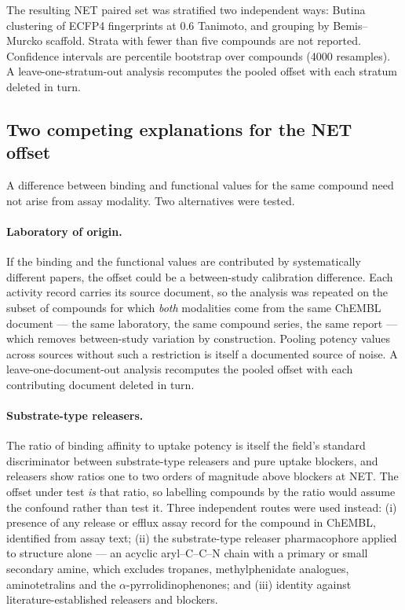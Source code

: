 \documentclass[11pt,a4paper]{article}
\begin{document}
The resulting NET paired set was stratified two independent ways: Butina
clustering \cite{Butina1999} of ECFP4 fingerprints at 0.6 Tanimoto, and grouping by
Bemis--Murcko scaffold. Strata with fewer than five compounds are not reported.
Confidence intervals are percentile bootstrap over compounds (4000 resamples).
A leave-one-stratum-out analysis recomputes the pooled offset with each stratum
deleted in turn.

\subsection{Two competing explanations for the NET offset}
\label{sec:confounds}
A difference between binding and functional values for the same compound need not
arise from assay modality. Two alternatives were tested.

\paragraph{Laboratory of origin.} If the binding and the functional values are
contributed by systematically different papers, the offset could be a between-study
calibration difference. Each activity record carries its source document, so the
analysis was repeated on the subset of compounds for which \emph{both} modalities come
from the same ChEMBL document --- the same laboratory, the same compound series, the
same report --- which removes between-study variation by construction. Pooling potency values across sources without such a restriction is itself a documented source of noise.\cite{Landrum2024} A
leave-one-document-out analysis recomputes the pooled offset with each contributing
document deleted in turn.

\paragraph{Substrate-type releasers.} The ratio of binding affinity to uptake potency
is itself the field's standard discriminator between substrate-type releasers and pure
uptake blockers,\cite{Eshleman2017} and releasers show ratios one to two orders of
magnitude above blockers at NET. The offset under test \emph{is} that ratio, so
labelling compounds by the ratio would assume the confound rather than test it. Three
independent routes were used instead: (i) presence of any release or efflux assay record
for the compound in ChEMBL, identified from assay text; (ii) the substrate-type
releaser pharmacophore applied to structure alone --- an acyclic aryl--C--C--N chain
with a primary or small secondary amine, which excludes tropanes, methylphenidate
analogues, aminotetralins and the $\alpha$-pyrrolidinophenones; and (iii) identity
against literature-established releasers and blockers.
\end{document}
